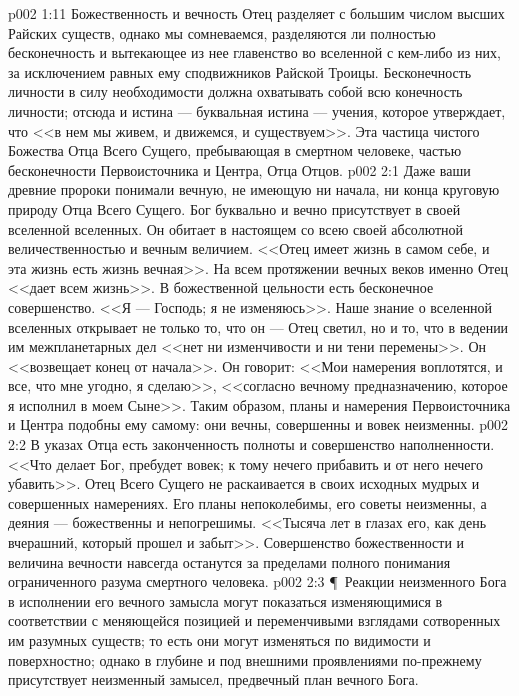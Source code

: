 \vs p002 1:11 Божественность и вечность Отец разделяет с большим числом высших Райских существ, однако мы сомневаемся, разделяются ли полностью бесконечность и вытекающее из нее главенство во вселенной с кем\hyp{}либо из них, за исключением равных ему сподвижников Райской Троицы. Бесконечность личности в силу необходимости должна охватывать собой всю конечность личности; отсюда и истина --- буквальная истина --- учения, которое утверждает, что <<в нем мы живем, и движемся, и существуем>>. Эта частица чистого Божества Отца Всего Сущего, пребывающая в смертном человеке,  частью бесконечности Первоисточника и Центра, Отца Отцов.
\vs p002 2:1 Даже ваши древние пророки понимали вечную, не имеющую ни начала, ни конца круговую природу Отца Всего Сущего. Бог буквально и вечно присутствует в своей вселенной вселенных. Он обитает в настоящем со всею своей абсолютной величественностью и вечным величием. <<Отец имеет жизнь в самом себе, и эта жизнь есть жизнь вечная>>. На всем протяжении вечных веков именно Отец <<дает всем жизнь>>. В божественной цельности есть бесконечное совершенство. <<Я --- Господь; я не изменяюсь>>. Наше знание о вселенной вселенных открывает не только то, что он --- Отец светил, но и то, что в ведении им межпланетарных дел <<нет ни изменчивости и ни тени перемены>>. Он <<возвещает конец от начала>>. Он говорит: <<Мои намерения воплотятся, и все, что мне угодно, я сделаю>>, <<согласно вечному предназначению, которое я исполнил в моем Сыне>>. Таким образом, планы и намерения Первоисточника и Центра подобны ему самому: они вечны, совершенны и вовек неизменны.
\vs p002 2:2 В указах Отца есть законченность полноты и совершенство наполненности. <<Что делает Бог, пребудет вовек; к тому нечего прибавить и от него нечего убавить>>. Отец Всего Сущего не раскаивается в своих исходных мудрых и совершенных намерениях. Его планы непоколебимы, его советы неизменны, а деяния --- божественны и непогрешимы. <<Тысяча лет в глазах его, как день вчерашний, который прошел и забыт>>. Совершенство божественности и величина вечности навсегда останутся за пределами полного понимания ограниченного разума смертного человека.
\vs p002 2:3 \P\ Реакции неизменного Бога в исполнении его вечного замысла могут показаться изменяющимися в соответствии с меняющейся позицией и переменчивыми взглядами сотворенных им разумных существ; то есть они могут изменяться по видимости и поверхностно; однако в глубине и под внешними проявлениями по\hyp{}прежнему присутствует неизменный замысел, предвечный план вечного Бога.
